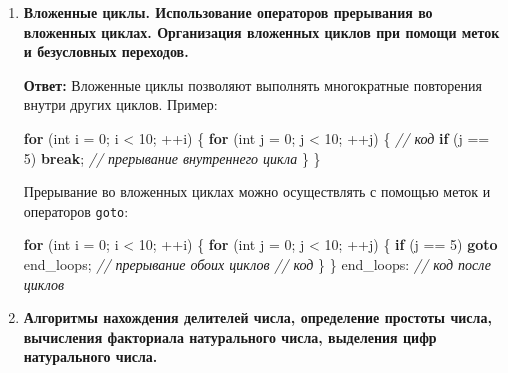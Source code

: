 \documentclass[
]{article}
\newenvironment{Shaded}{}{}
\newcommand{\CommentTok}[1]{\textcolor[rgb]{0.38,0.63,0.69}{\textit{#1}}}
\newcommand{\ControlFlowTok}[1]{\textcolor[rgb]{0.00,0.44,0.13}{\textbf{#1}}}
\newcommand{\DataTypeTok}[1]{\textcolor[rgb]{0.56,0.13,0.00}{#1}}
\newcommand{\DecValTok}[1]{\textcolor[rgb]{0.25,0.63,0.44}{#1}}
\newcommand{\NormalTok}[1]{#1}
\newcommand{\OperatorTok}[1]{\textcolor[rgb]{0.40,0.40,0.40}{#1}}
\begin{document}
\begin{enumerate}
\def\labelenumi{\arabic{enumi}.}
\setcounter{enumi}{8}
\item
  \textbf{Вложенные циклы. Использование операторов прерывания во
  вложенных циклах. Организация вложенных циклов при помощи меток и
  безусловных переходов.}

  \textbf{Ответ:} Вложенные циклы позволяют выполнять многократные
  повторения внутри других циклов. Пример:

\begin{Shaded}
\begin{Highlighting}[]
\ControlFlowTok{for} \OperatorTok{(}\DataTypeTok{int}\NormalTok{ i }\OperatorTok{=} \DecValTok{0}\OperatorTok{;}\NormalTok{ i }\OperatorTok{\textless{}} \DecValTok{10}\OperatorTok{;} \OperatorTok{++}\NormalTok{i}\OperatorTok{)} \OperatorTok{\{}
    \ControlFlowTok{for} \OperatorTok{(}\DataTypeTok{int}\NormalTok{ j }\OperatorTok{=} \DecValTok{0}\OperatorTok{;}\NormalTok{ j }\OperatorTok{\textless{}} \DecValTok{10}\OperatorTok{;} \OperatorTok{++}\NormalTok{j}\OperatorTok{)} \OperatorTok{\{}
        \CommentTok{// код}
        \ControlFlowTok{if} \OperatorTok{(}\NormalTok{j }\OperatorTok{==} \DecValTok{5}\OperatorTok{)} \ControlFlowTok{break}\OperatorTok{;} \CommentTok{// прерывание внутреннего цикла}
    \OperatorTok{\}}
\OperatorTok{\}}
\end{Highlighting}
\end{Shaded}

  Прерывание во вложенных циклах можно осуществлять с помощью меток и
  операторов \texttt{goto}:

\begin{Shaded}
\begin{Highlighting}[]
\ControlFlowTok{for} \OperatorTok{(}\DataTypeTok{int}\NormalTok{ i }\OperatorTok{=} \DecValTok{0}\OperatorTok{;}\NormalTok{ i }\OperatorTok{\textless{}} \DecValTok{10}\OperatorTok{;} \OperatorTok{++}\NormalTok{i}\OperatorTok{)} \OperatorTok{\{}
    \ControlFlowTok{for} \OperatorTok{(}\DataTypeTok{int}\NormalTok{ j }\OperatorTok{=} \DecValTok{0}\OperatorTok{;}\NormalTok{ j }\OperatorTok{\textless{}} \DecValTok{10}\OperatorTok{;} \OperatorTok{++}\NormalTok{j}\OperatorTok{)} \OperatorTok{\{}
        \ControlFlowTok{if} \OperatorTok{(}\NormalTok{j }\OperatorTok{==} \DecValTok{5}\OperatorTok{)} \ControlFlowTok{goto}\NormalTok{ end\_loops}\OperatorTok{;} \CommentTok{// прерывание обоих циклов}
        \CommentTok{// код}
    \OperatorTok{\}}
\OperatorTok{\}}
\NormalTok{end\_loops}\OperatorTok{:}
\CommentTok{// код после циклов}
\end{Highlighting}
\end{Shaded}
\item
  \textbf{Алгоритмы нахождения делителей числа, определение простоты
  числа, вычисления факториала натурального числа, выделения цифр
  натурального числа.}


\end{enumerate}
\end{document}
